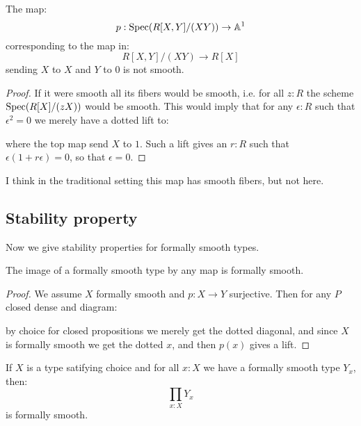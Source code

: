 \begin{lemma}
The map:
\[
p:\operatorname{Spec}(R[X,Y]/(XY))\to \mathbb{A}^1
\] 
corresponding to the map in:
\[
R[X,Y]/(XY) \to R[X]
\]
sending $X$ to $X$ and $Y$ to $0$ is not smooth.
\end{lemma}

\begin{proof}
If it were smooth all its fibers would be smooth, i.e. for all $z:R$ the scheme $\operatorname{Spec}(R[X]/(zX))$ would be smooth. This would imply that for any $\epsilon:R$ such that $\epsilon^2=0$ we merely have a dotted lift to:
 \begin{center}
    \end{center} 
    where the top map send $X$ to $1$. Such a lift gives an $r:R$ such that $\epsilon(1+r\epsilon)=0$, so that $\epsilon=0$.
\end{proof}

I think in the traditional setting this map has smooth fibers, but not here. 

\subsection{Stability property}

Now we give stability properties for formally smooth types.

\begin{proposition}
\label{smoothSurjective}
The image of a formally smooth type by any map is formally smooth.
\end{proposition}
\begin{proof}
We assume $X$ formally smooth and $p:X\to Y$ surjective. Then for any $P$ closed dense and diagram:
 \begin{center}
    \end{center} 
    by choice for closed propositions we merely get the dotted diagonal, and since $X$ is formally smooth we get the dotted $x$, and then $p(x)$ gives a lift.
\end{proof}

\begin{lemma}
If $X$ is a type satifying choice and for all $x:X$ we have a formally smooth type $Y_x$, then:
\[\prod_{x:X}Y_x\]
is formally smooth.
\end{lemma}

